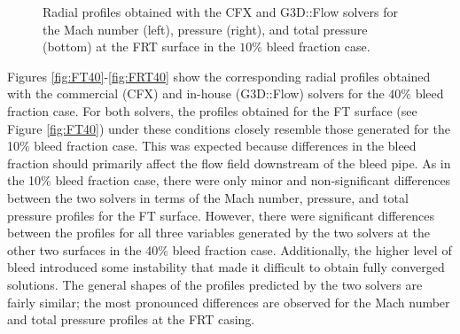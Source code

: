\begin{figure}[h!]
\begin{minipage}{0.48\columnwidth}
  \end{minipage}
  \caption{Radial profiles obtained with the CFX and G3D::Flow solvers for the Mach number (left), pressure (right), and total pressure (bottom) at the FRT surface in the $10\%$ bleed fraction case.} \label{fig:FRT10}
\end{figure}

Figures \ref{fig:FT40}-\ref{fig:FRT40} show the corresponding radial profiles obtained with the commercial (CFX) and in-house (G3D::Flow) solvers for the $40\%$ bleed fraction case. For both solvers, the profiles obtained for the FT surface (see Figure \ref{fig:FT40}) under these conditions closely resemble those generated for the 10\% bleed fraction case. This was expected because differences in the bleed fraction should primarily affect the flow field downstream of the bleed pipe. As in the 10\% bleed fraction case, there were only minor and non-significant differences between the two solvers in terms of the Mach number, pressure, and total pressure profiles for the FT surface. However, there were significant differences between the profiles for all three variables generated by the two solvers at the other two surfaces in the 40\% bleed fraction case. Additionally, the higher level of bleed introduced some instability that made it difficult to obtain fully converged solutions. The general shapes of the profiles predicted by the two solvers are fairly similar; the most pronounced differences are observed for the Mach number and total pressure profiles at the FRT casing.
%
